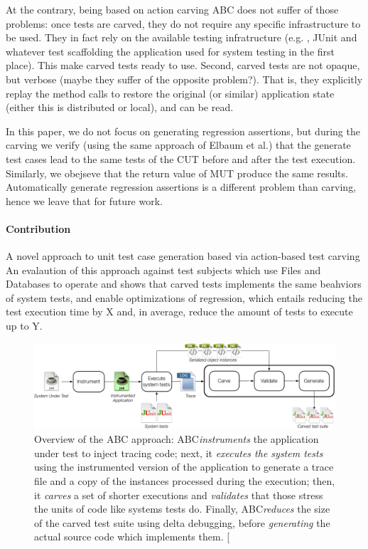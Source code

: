 \documentclass[10pt,conference]{IEEEtran}
\makeatletter
\gdef\xxx{\@ifnextchar[\xxx@lab\xxx@nolab}
\newcommand{\abc}{\textsf{ABC}\xspace}
\makeatother
\begin{document}
At the contrary,  being based on action carving \abc does not suffer of those problems: once tests are carved, they do not require any specific infrastructure to be used. They in fact rely on the available testing infratructure (e.g. , JUnit and whatever test scaffolding the application used for system testing in the first place). This make carved tests ready to use. Second, carved tests are not opaque, but verbose (maybe they suffer of the opposite problem?).
That is, they explicitly replay the method calls to restore the original (or similar) application state (either this is distributed or local), and can be read.

In this paper, we do not focus on generating regression assertions, but during the carving we verify (using the same approach of Elbaum et al.) that the generate test cases lead to the same tests of the CUT before and after the test execution. Similarly, we obejseve that the return value of MUT produce the same results. Automatically generate regression assertions is a different problem than carving, hence we leave that for future work.

\paragraph{Contribution}
A novel approach to unit test case generation based via action-based test carving
An evalaution of this approach against test subjects which use Files and Databases to operate and shows that carved tests
implements the same beahviors of system tests, and enable optimizations of regression, which entails reducing the test execution time by X and, in average, reduce the amount of tests to execute up to Y.


\begin{figure}[h!]
\centering
\includegraphics[width=\textwidth]{overview}
\caption{Overview of the \abc approach: \abc \emph{instruments} the application under test to inject tracing code; next, it \emph{executes the system tests} using the instrumented version of the application to generate a trace file and a copy of the instances processed during the execution; 
then, it \emph{carves} a set of shorter executions and \emph{validates} that those stress the units of code like systems tests
do. Finally, \abc \emph{reduces} the size of the carved test suite using delta debugging, before \emph{generating} the actual source code which implements them.
\xxx{Add delta debugging again}
}
\label{fig:overview}
\end{figure}
\end{document}
